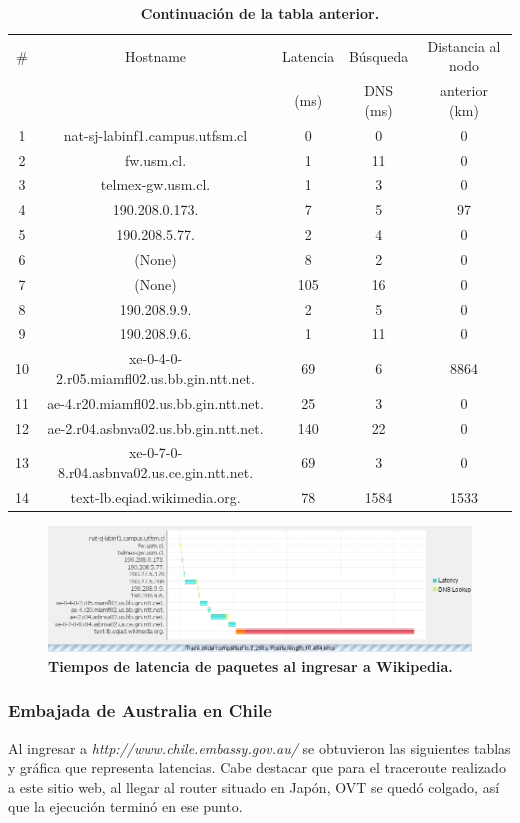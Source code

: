 \documentclass[12pt]{article}
\begin{document}
\begin{table}[H]
\centering
\begin{tabular}{| c | c | c | c | c |}
\hline
\# & Hostname & Latencia & Búsqueda & Distancia al nodo\\
 &  & (ms) & DNS (ms) & anterior (km)\\
\hline
1 & nat-sj-labinf1.campus.utfsm.cl & 0 & 0 & 0\\
\hline
2 & fw.usm.cl. & 1 & 11 & 0\\
\hline
3 & telmex-gw.usm.cl. & 1 & 3 & 0\\
\hline
4 & 190.208.0.173. & 7 & 5 & 97\\
\hline
5 & 190.208.5.77. & 2 & 4 & 0\\
\hline
6 & (None) & 8 & 2 & 0\\
\hline
7 & (None) & 105 & 16 & 0\\
\hline
8 & 190.208.9.9. & 2 & 5 & 0\\
\hline
9 & 190.208.9.6. & 1 & 11 & 0\\
\hline
10 & xe-0-4-0-2.r05.miamfl02.us.bb.gin.ntt.net. & 69 & 6 & 8864\\
\hline
11 & ae-4.r20.miamfl02.us.bb.gin.ntt.net. & 25 & 3 & 0\\
\hline
12 & ae-2.r04.asbnva02.us.bb.gin.ntt.net. & 140 & 22 & 0\\
\hline
13 & xe-0-7-0-8.r04.asbnva02.us.ce.gin.ntt.net. & 69 & 3 & 0\\
\hline
14 & text-lb.eqiad.wikimedia.org. & 78 & 1584 & 1533\\
\hline
\end{tabular}
\caption{\small \textbf{Continuación de la tabla anterior.}}
\end{table}

\begin{figure}[H] 
\centering 
\includegraphics[width=1\textwidth]{imagenes/wiki_grafica.png} \caption{\small \textbf{Tiempos de latencia de paquetes al ingresar a Wikipedia.}}
\label{fig:diagrama_4} 
\end{figure}

\subsubsection{Embajada de Australia en Chile}
Al ingresar a \emph{http://www.chile.embassy.gov.au/} se obtuvieron las siguientes tablas y gráfica que representa latencias. Cabe destacar que para el traceroute realizado a este sitio web, al llegar al router situado en Japón, OVT se quedó colgado, así que la ejecución terminó en ese punto.\\
\end{document}

